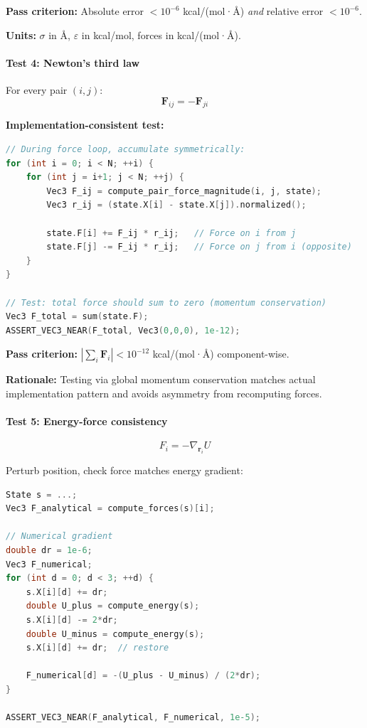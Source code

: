 \documentclass[11pt]{article}
\begin{document}
\textbf{Pass criterion:} Absolute error $< 10^{-6}$ kcal/(mol·Å) \textit{and} relative error $< 10^{-6}$.

\textbf{Units:} $\sigma$ in Å, $\varepsilon$ in kcal/mol, forces in kcal/(mol·Å).

\paragraph{Test 4: Newton's third law}

For every pair $(i, j)$:
\begin{equation}
\mathbf{F}_{ij} = -\mathbf{F}_{ji}
\end{equation}

\textbf{Implementation-consistent test:}

\begin{lstlisting}[language=C++]
// During force loop, accumulate symmetrically:
for (int i = 0; i < N; ++i) {
    for (int j = i+1; j < N; ++j) {
        Vec3 F_ij = compute_pair_force_magnitude(i, j, state);
        Vec3 r_ij = (state.X[i] - state.X[j]).normalized();

        state.F[i] += F_ij * r_ij;   // Force on i from j
        state.F[j] -= F_ij * r_ij;   // Force on j from i (opposite)
    }
}

// Test: total force should sum to zero (momentum conservation)
Vec3 F_total = sum(state.F);
ASSERT_VEC3_NEAR(F_total, Vec3(0,0,0), 1e-12);
\end{lstlisting}

\textbf{Pass criterion:} $|\sum_i \mathbf{F}_i| < 10^{-12}$ kcal/(mol·Å) component-wise.

\textbf{Rationale:} Testing via global momentum conservation matches actual implementation pattern and avoids asymmetry from recomputing forces.

\paragraph{Test 5: Energy-force consistency}

\begin{equation}
F_i = -\nabla_{\mathbf{r}_i} U
\end{equation}

Perturb position, check force matches energy gradient:

\begin{lstlisting}[language=C++]
State s = ...;
Vec3 F_analytical = compute_forces(s)[i];

// Numerical gradient
double dr = 1e-6;
Vec3 F_numerical;
for (int d = 0; d < 3; ++d) {
    s.X[i][d] += dr;
    double U_plus = compute_energy(s);
    s.X[i][d] -= 2*dr;
    double U_minus = compute_energy(s);
    s.X[i][d] += dr;  // restore
    
    F_numerical[d] = -(U_plus - U_minus) / (2*dr);
}

ASSERT_VEC3_NEAR(F_analytical, F_numerical, 1e-5);
\end{lstlisting}
\end{document}
